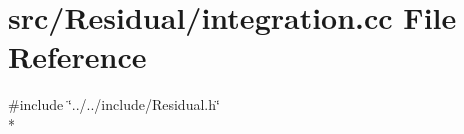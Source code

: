 \section{src/\-Residual/integration.cc File Reference}
\label{integration_8cc}
{\ttfamily \#include \char`\"{}../../include/\-Residual.\-h\char`\"{}}\\*
